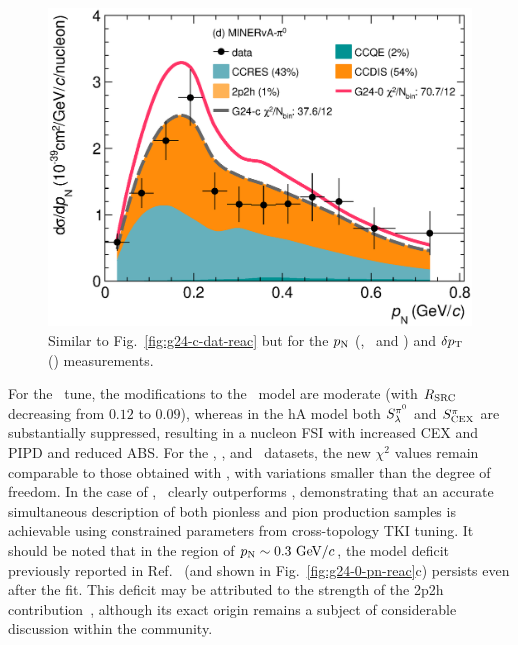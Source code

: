 \begin{figure}
        \includegraphics[width=\dbfigwid\textwidth]{figures/tuning/0026-min_pi0_pn_reac_decomp_covfix.eps}
        \caption{\label{fig:g24-c-pn-reac}  
        Similar to Fig.~\ref{fig:g24-c-dat-reac} but for the $p_\textrm{N}$ (\ttkpip, \minzpi\ and \minpiz) and $\delta p_\textrm{T}$ (\ttkzpi) measurements. 
        } 
    \end{figure}

    For the \gC\ tune, the modifications to the \sfcfg\ model are moderate (with $R_\textrm{SRC}$ decreasing from $0.12$ to $0.09$), whereas in the hA model both $S_\lambda^{\pi^{0}}$ and $S_\textrm{CEX}^{\pi}$ are substantially suppressed, resulting in a nucleon FSI with increased CEX and PIPD and reduced ABS.  
    For the \ttkzpi, \ttkpip, and \minzpi\ datasets, the new $\chi^2$ values remain comparable to those obtained with \gZero, with variations smaller than the degree of freedom. 
    In the case of \minpiz, \gC\ clearly outperforms \gZero, demonstrating that an accurate simultaneous description of both pionless and pion production samples is achievable using constrained parameters from cross-topology TKI tuning. 
    It should be noted that in the region of $p_\textrm{N}\sim0.3~\textrm{GeV}/c$, the model deficit previously reported in Ref.~\cite{MINERvA:2018hba} (and shown in Fig.~\ref{fig:g24-0-pn-reac}c) persists even after the fit. 
    This deficit may be attributed to the strength of the 2p2h contribution~\cite{MINERvA:2018hba}, although its exact origin remains a subject of considerable discussion within the community.

